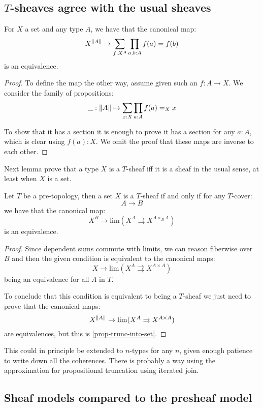 \subsection{$T$-sheaves agree with the usual sheaves}

\begin{lemma}\label{prop-trunc-into-set}
For $X$ a set and any type $A$, we have that the canonical map:
\[X^{\lVert A \rVert} \to \sum_{f:X^A} \prod_{a,b:A} f(a)=f(b)\]
is an equivalence.
\end{lemma}

\begin{proof}
To define the map the other way, assume given such an $f:A\to X$. We consider the family of propositions:
\[ \_:\lVert A \rVert \mapsto \sum_{x:X} \prod_{a:A} f(a)=_X x\]

To show that it has a section it is enough to prove it has a section for any $a:A$, which is clear using $f(a):X$. We omit the proof that these maps are inverse to each other.
\end{proof}

Next lemma prove that a type $X$ is a $T$-sheaf iff it is a sheaf in the usual sense, at least when $X$ is a set.

\begin{lemma}\label{set-sheaves-condition}
Let $T$ be a pre-topology, then a set $X$ is a $T$-sheaf if and only if for any $T$-cover:
\[A\to B\]
we have that the canonical map: 
\[X^B\to \mathrm{lim} (X^A \rightrightarrows X^{A\times_BA})\]
is an equivalence.
\end{lemma}

\begin{proof}
Since dependent sums commute with limits, we can reason fiberwise over $B$ and then the given condition is equivalent to the canonical maps:
\[X\to \mathrm{lim} (X^A \rightrightarrows X^{A\times A})\]
being an equivalence for all $A$ in $T$. 

To conclude that this condition is equivalent to being a $T$-sheaf we just need to prove that the canonical maps:
\[X^{\lVert A \rVert} \to \mathrm{lim} (X^A \rightrightarrows X^{A\times A})\]
are equivalences, but this is \cref{prop-trunc-into-set}.
\end{proof}

This could in principle be extended to $n$-types for any $n$, given enough patience to write down all the coherences. There is probably a way using the approximation for propositional truncation using iterated join.

\subsection{Sheaf models compared to the presheaf model}

